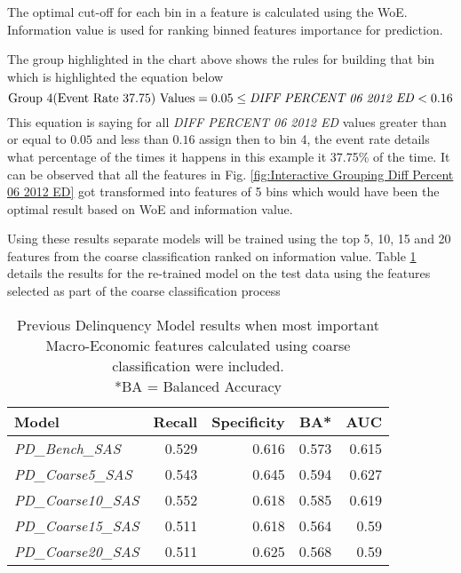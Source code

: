 The optimal cut-off for each bin in a feature is calculated using the WoE. Information value is used for ranking binned features importance for prediction. 

The group highlighted in the chart above shows the rules for building that bin which is highlighted the equation below
\[
\text{Group 4(Event Rate 37.75) Values} = 0.05 \leq \text{\textit{DIFF PERCENT 06 2012 ED}} < 0.16
\]
This equation is saying for all \textit{DIFF PERCENT 06 2012 ED} values greater than or equal to $0.05$ and less than $0.16$ assign then to bin 4, the event rate details what percentage of the times it happens in this example it 37.75\% of the time. It can be observed that all the features in Fig. \ref{fig:Interactive Grouping Diff Percent 06 2012 ED} got transformed into features of 5 bins which would have been the optimal result based on WoE and information value.

Using these results separate models will be trained using the top 5, 10, 15 and 20 features from
the coarse classification ranked on information value. Table \ref{table:CoarsePDModelResults} details the results for the re-trained model
on the test data using the features selected as part of the coarse classification process

\begin{table}[H]
	\centering
	\small
	\begin{tabular}{l r r r r}
		\hline
		\textbf{Model} & \textbf{Recall} & \textbf{Specificity} & \textbf{BA*} & \textbf{AUC}  \\ \hline
		\textit{PD\_Bench\_SAS} & 0.529 & 0.616 & 0.573 & 0.615 \\ \hline
		\textit{PD\_Coarse5\_SAS}  & 0.543 & \cellcolor{green!25}0.645 & \cellcolor{green!25}0.594 & \cellcolor{green!25}0.627   \\ 
		\textit{PD\_Coarse10\_SAS} & \cellcolor{green!25}0.552 & 0.618 & 0.585 & 0.619  \\ 
		\textit{PD\_Coarse15\_SAS} & 0.511 & 0.618 & 0.564 & 0.59  \\
		\textit{PD\_Coarse20\_SAS} & 0.511 & 0.625 & 0.568 & 0.59  \\\hline 
	\end{tabular}
	\caption{Previous Delinquency Model results when most important\\
		Macro-Economic features calculated using coarse classification were included.
		\\ *BA = Balanced Accuracy}
	\label{table:CoarsePDModelResults}
\end{table}

